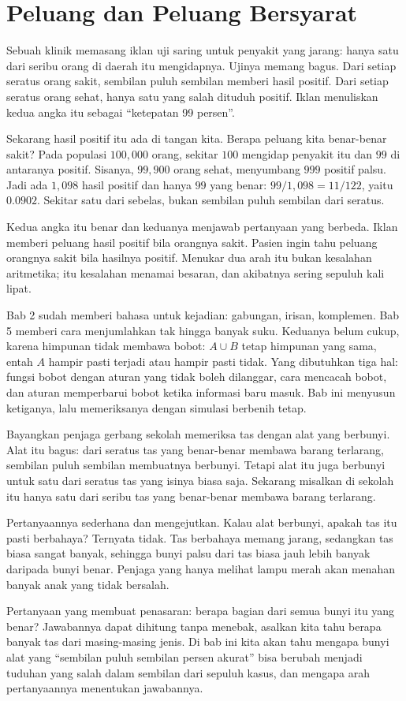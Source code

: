 \chapter{Peluang dan Peluang Bersyarat}

Sebuah klinik memasang iklan uji saring untuk penyakit yang jarang: hanya satu dari
seribu orang di daerah itu mengidapnya. Ujinya memang bagus. Dari setiap seratus orang
sakit, sembilan puluh sembilan memberi hasil positif. Dari setiap seratus orang sehat,
hanya satu yang salah dituduh positif. Iklan menuliskan kedua angka itu sebagai
``ketepatan 99 persen''.

Sekarang hasil positif itu ada di tangan kita. Berapa peluang kita benar-benar sakit?
Pada populasi $100{,}000$ orang, sekitar $100$ mengidap penyakit itu dan $99$ di
antaranya positif. Sisanya, $99{,}900$ orang sehat, menyumbang $999$ positif palsu.
Jadi ada $1{,}098$ hasil positif dan hanya $99$ yang benar: $99/1{,}098=11/122$,
yaitu $0.0902$. Sekitar satu dari sebelas, bukan sembilan puluh sembilan dari seratus.

Kedua angka itu benar dan keduanya menjawab pertanyaan yang berbeda. Iklan memberi
peluang hasil positif bila orangnya sakit. Pasien ingin tahu peluang orangnya sakit
bila hasilnya positif. Menukar dua arah itu bukan kesalahan aritmetika; itu kesalahan
menamai besaran, dan akibatnya sering sepuluh kali lipat.

Bab 2 sudah memberi bahasa untuk kejadian: gabungan, irisan, komplemen. Bab 5 memberi
cara menjumlahkan tak hingga banyak suku. Keduanya belum cukup, karena himpunan tidak
membawa bobot: $A\cup B$ tetap himpunan yang sama, entah $A$ hampir pasti terjadi atau
hampir pasti tidak. Yang dibutuhkan tiga hal: fungsi bobot dengan aturan yang tidak boleh
dilanggar, cara mencacah bobot, dan aturan memperbarui bobot ketika informasi baru masuk.
Bab ini menyusun ketiganya, lalu memeriksanya dengan simulasi berbenih tetap.

\begin{untukanak}
Bayangkan penjaga gerbang sekolah memeriksa tas dengan alat yang berbunyi. Alat itu
bagus: dari seratus tas yang benar-benar membawa barang terlarang, sembilan puluh
sembilan membuatnya berbunyi. Tetapi alat itu juga berbunyi untuk satu dari seratus
tas yang isinya biasa saja. Sekarang misalkan di sekolah itu hanya satu dari seribu
tas yang benar-benar membawa barang terlarang.

Pertanyaannya sederhana dan mengejutkan. Kalau alat berbunyi, apakah tas itu pasti
berbahaya? Ternyata tidak. Tas berbahaya memang jarang, sedangkan tas biasa sangat
banyak, sehingga bunyi palsu dari tas biasa jauh lebih banyak daripada bunyi benar.
Penjaga yang hanya melihat lampu merah akan menahan banyak anak yang tidak bersalah.

Pertanyaan yang membuat penasaran: berapa bagian dari semua bunyi itu yang benar?
Jawabannya dapat dihitung tanpa menebak, asalkan kita tahu berapa banyak tas dari
masing-masing jenis. Di bab ini kita akan tahu mengapa bunyi alat yang ``sembilan puluh
sembilan persen akurat'' bisa berubah menjadi tuduhan yang salah dalam sembilan dari
sepuluh kasus, dan mengapa arah pertanyaannya menentukan jawabannya.
\end{untukanak}

